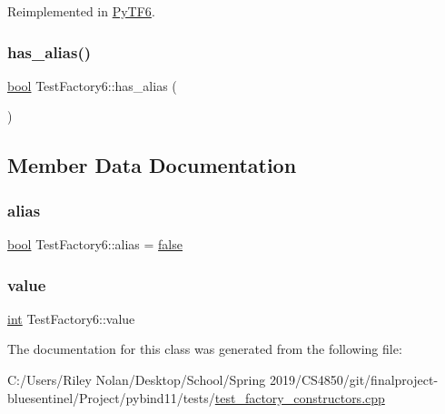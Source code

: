 Reimplemented in \mbox{\hyperlink{class_py_t_f6_ae98e91c8c1c7533878f3970158b9b0b7}{Py\+T\+F6}}.

\mbox{\label{class_test_factory6_afb8d38ad2654433a76942071b035c934}} 
\subsubsection{\texorpdfstring{has\_alias()}{has\_alias()}}
{\footnotesize\ttfamily \mbox{\hyperlink{asdl_8h_af6a258d8f3ee5206d682d799316314b1}{bool}} Test\+Factory6\+::has\+\_\+alias (\begin{DoxyParamCaption}{ }\end{DoxyParamCaption})\hspace{0.3cm}{\ttfamily [inline]}}



\subsection{Member Data Documentation}
\mbox{\label{class_test_factory6_a1a0c08d0ce454165578f9378df457fac}} 
\subsubsection{\texorpdfstring{alias}{alias}}
{\footnotesize\ttfamily \mbox{\hyperlink{asdl_8h_af6a258d8f3ee5206d682d799316314b1}{bool}} Test\+Factory6\+::alias = \mbox{\hyperlink{asdl_8h_af6a258d8f3ee5206d682d799316314b1ae9de385ef6fe9bf3360d1038396b884c}{false}}\hspace{0.3cm}{\ttfamily [protected]}}

\mbox{\label{class_test_factory6_ac839507ceb1f381b20566662dfd28f67}} 
\subsubsection{\texorpdfstring{value}{value}}
{\footnotesize\ttfamily \mbox{\hyperlink{warnings_8h_a74f207b5aa4ba51c3a2ad59b219a423b}{int}} Test\+Factory6\+::value\hspace{0.3cm}{\ttfamily [protected]}}



The documentation for this class was generated from the following file\+:\begin{DoxyCompactItemize}
\item 
C\+:/\+Users/\+Riley Nolan/\+Desktop/\+School/\+Spring 2019/\+C\+S4850/git/finalproject-\/bluesentinel/\+Project/pybind11/tests/\mbox{\hyperlink{test__factory__constructors_8cpp}{test\+\_\+factory\+\_\+constructors.\+cpp}}\end{DoxyCompactItemize}
